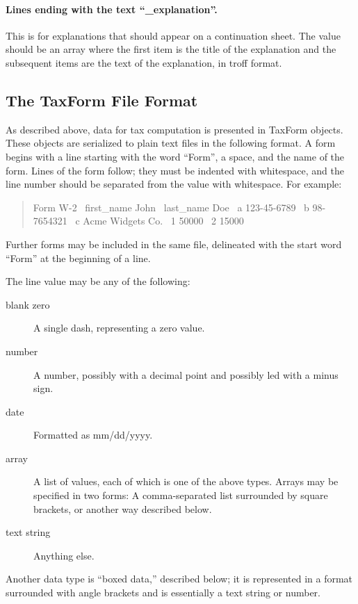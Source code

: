 \documentclass[12pt]{article}
\begin{document}
\paragraph{Lines ending with the text ``\_explanation''.} This is for
explanations that should appear on a continuation sheet. The value should be an
array where the first item is the title of the explanation and the subsequent
items are the text of the explanation, in troff format.





\subsection{The TaxForm File Format}

As described above, data for tax computation is presented in TaxForm objects.
These objects are serialized to plain text files in the following format.
A form begins with a line starting with the word ``Form'', a space, and the
name of the form. Lines of the form follow; they must be indented with
whitespace, and the line number should be separated from the value with
whitespace. For example:
\begin{quote}
\ttfamily\obeylines\obeyspaces
Form W-2
\     first\_name          John
\     last\_name           Doe
\     a                   123-45-6789
\     b                   98-7654321
\     c                   Acme Widgets Co.
\     1                   50000
\     2                   15000
\end{quote}
Further forms may be included in the same file, delineated with the start word
``Form'' at the beginning of a line.

The line value may be any of the following:
\begin{description}
\item[blank zero] A single dash, representing a zero value.
\item[number] A number, possibly with a decimal point and possibly led with a
minus sign.
\item[date] Formatted as mm/dd/yyyy.
\item[array] A list of values, each of which is one of the above types. Arrays
may be specified in two forms: A comma-separated list surrounded by square
brackets, or another way described below.
\item[text string] Anything else.
\end{description}
Another data type is ``boxed data,'' described below; it is represented in a
format surrounded with angle brackets and is essentially a text string or
number.
\end{document}
